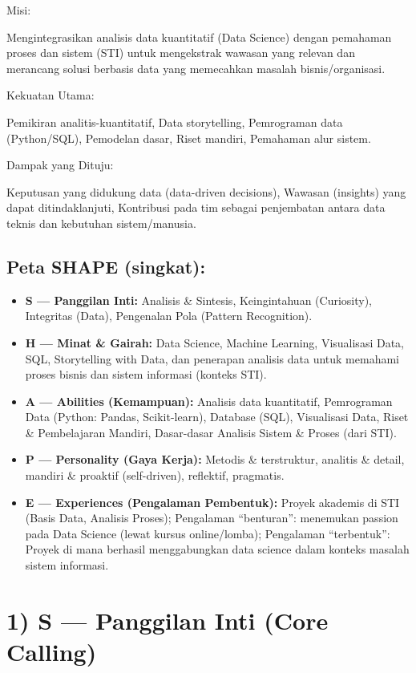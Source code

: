 \documentclass[
  letterpaper,
  DIV=11,
  numbers=noendperiod]{scrreprt}
\providecommand{\tightlist}{%
  \setlength{\itemsep}{0pt}\setlength{\parskip}{0pt}}
\begin{document}
Misi:

Mengintegrasikan analisis data kuantitatif (Data Science) dengan
pemahaman proses dan sistem (STI) untuk mengekstrak wawasan yang relevan
dan merancang solusi berbasis data yang memecahkan masalah
bisnis/organisasi.

Kekuatan Utama:

Pemikiran analitis-kuantitatif, Data storytelling, Pemrograman data
(Python/SQL), Pemodelan dasar, Riset mandiri, Pemahaman alur sistem.

Dampak yang Dituju:

Keputusan yang didukung data (data-driven decisions), Wawasan (insights)
yang dapat ditindaklanjuti, Kontribusi pada tim sebagai penjembatan
antara data teknis dan kebutuhan sistem/manusia.

\subsection{Peta SHAPE (singkat):}\label{peta-shape-singkat}

\begin{itemize}
\tightlist
\item
  \textbf{S --- Panggilan Inti:} Analisis \& Sintesis, Keingintahuan
  (Curiosity), Integritas (Data), Pengenalan Pola (Pattern Recognition).
\item
  \textbf{H --- Minat \& Gairah:} Data Science, Machine Learning,
  Visualisasi Data, SQL, Storytelling with Data, dan penerapan analisis
  data untuk memahami proses bisnis dan sistem informasi (konteks STI).
\item
  \textbf{A --- Abilities (Kemampuan):} Analisis data kuantitatif,
  Pemrograman Data (Python: Pandas, Scikit-learn), Database (SQL),
  Visualisasi Data, Riset \& Pembelajaran Mandiri, Dasar-dasar Analisis
  Sistem \& Proses (dari STI).
\item
  \textbf{P --- Personality (Gaya Kerja):} Metodis \& terstruktur,
  analitis \& detail, mandiri \& proaktif (self-driven), reflektif,
  pragmatis.
\item
  \textbf{E --- Experiences (Pengalaman Pembentuk):} Proyek akademis di
  STI (Basis Data, Analisis Proses); Pengalaman ``benturan'': menemukan
  passion pada Data Science (lewat kursus online/lomba); Pengalaman
  ``terbentuk'': Proyek di mana berhasil menggabungkan data science
  dalam konteks masalah sistem informasi.
\end{itemize}

\section{1) S --- Panggilan Inti (Core
Calling)}\label{s-panggilan-inti-core-calling}
\end{document}
